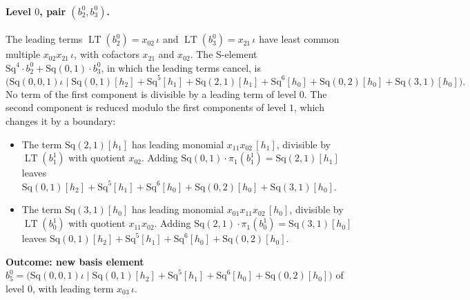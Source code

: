 \documentclass[11pt]{article}
\newcommand{\Sq}{\mathrm{Sq}}
\DeclareMathOperator{\LT}{LT}
\begin{document}
\paragraph{Level $0$, pair $(b^{0}_{2}, b^{0}_{3})$.} The leading terms $\LT(b^{0}_{2}) = x_{02}\,\iota$ and $\LT(b^{0}_{3}) = x_{21}\,\iota$ have least common multiple $x_{02}x_{21}\,\iota$, with cofactors $x_{21}$ and $x_{02}$. The S-element $\Sq^{4}\cdot b^{0}_{2} + \Sq(0,1)\cdot b^{0}_{3}$, in which the leading terms cancel, is
\[\bigl(\Sq(0,0,1)\iota \;\big|\; \Sq(0,1)[h_2] + \Sq^{5}[h_1] + \Sq(2,1)[h_1] + \Sq^{6}[h_0] + \Sq(0,2)[h_0] + \Sq(3,1)[h_0]\bigr).\]
No term of the first component is divisible by a leading term of level $0$.
The second component is reduced modulo the first components of level $1$, which changes it by a boundary:
\begin{itemize}
\item The term $\Sq(2,1)[h_1]$ has leading monomial $x_{11}x_{02}\,[h_1]$, divisible by $\LT(b^{1}_{1})$ with quotient $x_{02}$. Adding $\Sq(0,1)\cdot \pi_1(b^{1}_{1}) = \Sq(2,1)[h_1]$ leaves $\Sq(0,1)[h_2] + \Sq^{5}[h_1] + \Sq^{6}[h_0] + \Sq(0,2)[h_0] + \Sq(3,1)[h_0]$.
\item The term $\Sq(3,1)[h_0]$ has leading monomial $x_{01}x_{11}x_{02}\,[h_0]$, divisible by $\LT(b^{1}_{0})$ with quotient $x_{11}x_{02}$. Adding $\Sq(2,1)\cdot \pi_1(b^{1}_{0}) = \Sq(3,1)[h_0]$ leaves $\Sq(0,1)[h_2] + \Sq^{5}[h_1] + \Sq^{6}[h_0] + \Sq(0,2)[h_0]$.
\end{itemize}
\textbf{Outcome: new basis element} $b^{0}_{5} = \bigl(\Sq(0,0,1)\iota \;\big|\; \Sq(0,1)[h_2] + \Sq^{5}[h_1] + \Sq^{6}[h_0] + \Sq(0,2)[h_0]\bigr)$ of level $0$, with leading term $x_{03}\,\iota$.
\medskip
\end{document}
